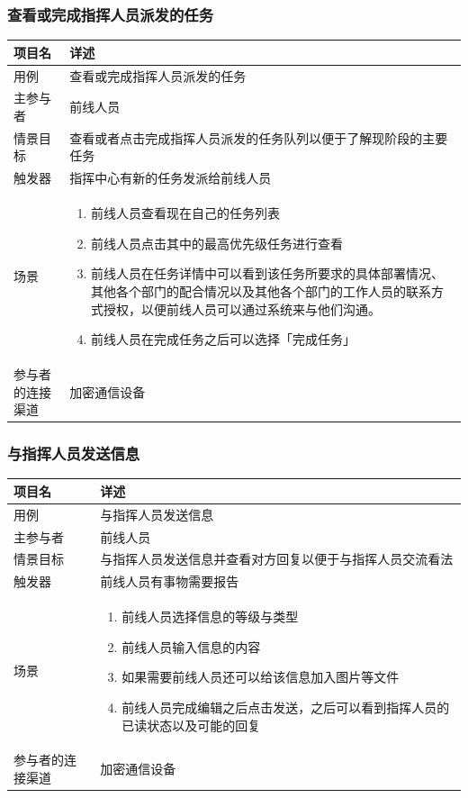 \documentclass{ctexrep}
\begin{document}
\subsubsection{查看或完成指挥人员派发的任务}
\begin{longtable}{p{2cm} | p{10cm}}
\hline
项目名 & 详述 \\
\hline
\hline
用例 &  查看或完成指挥人员派发的任务\\
\hline
主参与者 &前线人员  \\
\hline
情景目标 &查看或者点击完成指挥人员派发的任务队列以便于了解现阶段的主要任务  \\
\hline
触发器 & 指挥中心有新的任务发派给前线人员 \\
\hline
场景 & \begin{enumerate}
	\item 前线人员查看现在自己的任务列表
	\item 前线人员点击其中的最高优先级任务进行查看
	\item 前线人员在任务详情中可以看到该任务所要求的具体部署情况、其他各个部门的配合情况以及其他各个部门的工作人员的联系方式授权，以便前线人员可以通过系统来与他们沟通。
	\item 前线人员在完成任务之后可以选择「完成任务」
\end{enumerate} \\
\hline
参与者的连接渠道 & 加密通信设备\\
\hline
\end{longtable}

\subsubsection{与指挥人员发送信息}
\begin{longtable}{p{2cm} | p{10cm}}
\hline
项目名 & 详述 \\
\hline
\hline
用例 &  与指挥人员发送信息\\
\hline
主参与者 & 前线人员  \\
\hline
情景目标 &  与指挥人员发送信息并查看对方回复以便于与指挥人员交流看法 \\
\hline
触发器 & 前线人员有事物需要报告 \\
\hline
场景 & \begin{enumerate}
	\item 前线人员选择信息的等级与类型
	\item 前线人员输入信息的内容
	\item 如果需要前线人员还可以给该信息加入图片等文件
	\item 前线人员完成编辑之后点击发送，之后可以看到指挥人员的已读状态以及可能的回复
\end{enumerate} \\
\hline
参与者的连接渠道 & 加密通信设备 \\
\hline
\end{longtable}
\end{document}

